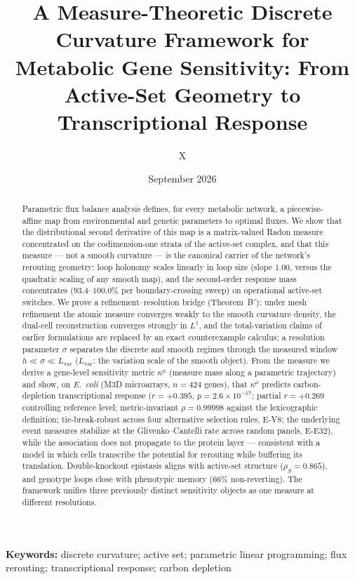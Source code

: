 \documentclass[11pt,a4paper]{article}
\title{A Measure-Theoretic Discrete Curvature Framework for Metabolic
       Gene Sensitivity: From Active-Set Geometry to Transcriptional
       Response}
\author{X}
\date{September 2026}
\theoremstyle{plain}
\theoremstyle{definition}
\theoremstyle{remark}
\newcommand{\kmu}{\kappa^{\mu}}
\begin{document}
\maketitle

\begin{abstract}
\noindent
Parametric flux balance analysis defines, for every metabolic network, a
piecewise-affine map from environmental and genetic parameters to optimal
fluxes. We show that the distributional second derivative of this map is a
matrix-valued Radon measure concentrated on the codimension-one strata of the
active-set complex, and that this measure --- not a smooth curvature ---
is the canonical carrier of the network's rerouting geometry: loop holonomy
scales linearly in loop size (slope $1.00$, versus the quadratic scaling of
any smooth map), and the second-order response mass concentrates
($93.4$--$100.0\%$ per boundary-crossing sweep) on operational active-set
switches. We prove a
refinement--resolution bridge (Theorem~B$'$): under mesh refinement the
atomic measure converges weakly to the smooth curvature density, the
dual-cell reconstruction converges strongly in $L^1$, and the total-variation
claims of earlier formulations are replaced by an exact counterexample
calculus; a resolution parameter $\sigma$ separates the discrete and smooth
regimes through the measured window $h \ll \sigma \ll L_{\mathrm{var}}$
($L_{\mathrm{var}}$: the variation scale of the smooth object).
From the measure we derive a gene-level sensitivity metric $\kmu$ (measure
mass along a parametric trajectory) and show, on
\emph{E.~coli} (M3D microarrays, $n=424$ genes), that $\kmu$ predicts
carbon-depletion transcriptional response ($r = +0.395$,
$p = 2.6 \times 10^{-17}$; partial $r = +0.269$ controlling reference
level; metric-invariant $\rho = 0.99998$ against the lexicographic
definition; tie-break-robust across four alternative selection rules,
E-V8; the underlying event measures stabilize at the
Glivenko--Cantelli rate across random panels, E-E32), while the
association does not propagate to the protein layer
--- consistent with a model in which cells transcribe the potential for
rerouting while buffering its translation. Double-knockout epistasis aligns
with active-set structure ($\rho_S = 0.865$), and genotype loops close with
phenotypic memory ($66\%$ non-reverting). The framework unifies three
previously distinct sensitivity objects as one measure at different
resolutions.
\end{abstract}

\medskip
\noindent\textbf{Keywords:} discrete curvature; active set; parametric
linear programming; flux rerouting; transcriptional response;
carbon depletion
\end{document}
